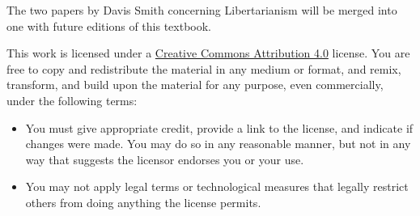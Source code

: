 The two papers by Davis Smith concerning Libertarianism will be merged into one with future editions of this textbook.

This work is licensed under a \href{https://creativecommons.org/licenses/by/4.0/}{Creative Commons Attribution 4.0} license.
You are free to copy and redistribute the material in any medium or format, and  remix, transform, and build upon the material for any purpose, even commercially, under the following terms:
\begin{itemize}
\item You must give appropriate credit, provide a link to the license, and indicate if changes were made. You may do so in any reasonable manner, but not in any way that suggests the licensor endorses you or your use.
\item You may not apply legal terms or technological measures that legally restrict others from doing anything the license permits.
\end{itemize}


\bigskip
